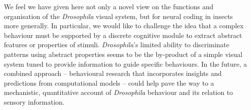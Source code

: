 We feel we have given here not only a novel view on the functions and organisation of the \emph{Drosophila} visual system, but for neural coding in insects more generally.
In particular, we would like to challenge the idea that a complex behaviour must be supported by a discrete cognitive module to extract abstract features or properties of stimuli.
\emph{Drosophila}'s limited ability to discriminate patterns using abstract properties seems to be the by-product of a simple visual system tuned to provide information to guide specific behaviours.
In the future, a combined approach -- behavioural research that incorporates insights and predictions from computational models -- could help pave the way to a mechanistic, quantitative account of \emph{Drosophila} behaviour and its relation to sensory information.
